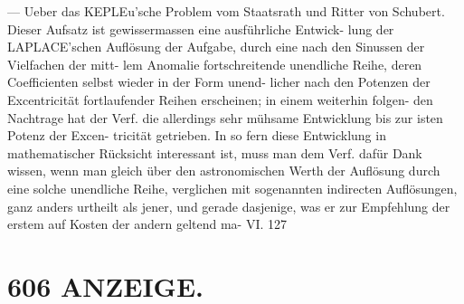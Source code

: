 \documentclass[12pt,a4paper]{article}
\begin{document}
{{{{{{{{---  Ueber  das  KEPLEu'sche  Problem vom  Staatsrath  und  Ritter  von  Schubert.  Dieser  Aufsatz  ist  gewissermassen  eine  ausführliche  Entwick- lung der  LAPLACE'schen  Auflösung  der  Aufgabe,  durch  eine  nach  den  Sinussen  der  Vielfachen  der  mitt- lem Anomalie  fortschreitende  unendliche  Reihe,  deren  Coefficienten  selbst  wieder  in  der  Form  unend- licher nach  den  Potenzen  der  Excentricität  fortlaufender  Reihen  erscheinen;  in  einem  weiterhin  folgen- den Nachtrage  hat  der  Verf.  die  allerdings  sehr  mühsame  Entwicklung  bis  zur  isten  Potenz  der  Excen- tricität getrieben.  In  so  fern  diese  Entwicklung  in  mathematischer  Rücksicht  interessant  ist,  muss  man dem  Verf.  dafür  Dank  wissen,  wenn  man  gleich  über  den  astronomischen  Werth  der  Auflösung  durch eine  solche  unendliche  Reihe,  verglichen  mit  sogenannten  indirecten  Auflösungen,  ganz  anders  urtheilt als  jener,  und  gerade  dasjenige,  was  er  zur  Empfehlung  der  erstem  auf  Kosten  der  andern  geltend  ma- VI. 127


\section*{606  ANZEIGE.}

}}}}}}}}
\end{document}

